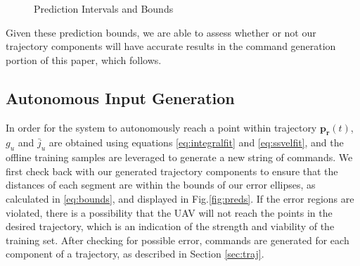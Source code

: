 \documentclass[letterpaper, 10 pt, conference]{ieeeconf}  %
\begin{document}
\begin{figure}[ht]
	\centering
	\caption{Prediction Intervals and Bounds}
	\label{fig:bounds}
\end{figure}

Given these prediction bounds, we are able to assess whether or not our trajectory components will have accurate results in the command generation portion of this paper, which follows.

\subsection{Autonomous Input Generation} \label{sec:generate}

In order for the system to autonomously reach a point within trajectory $\bm{p_r}(t)$, $g_u$ and $\bar{j}_u$ are obtained using equations \eqref{eq:integralfit} and \eqref{eq:ssvelfit}, and the offline training samples are leveraged to generate a new string of commands. We first check back with our generated trajectory components to ensure that the distances of each segment are within the bounds of our error ellipses, as calculated in \eqref{eq:bounds}, and displayed in Fig.\ref{fig:preds}. If the error regions are violated, there is a possibility that the UAV will not reach the points in the desired trajectory, which is an indication of the strength and viability of the training set. After checking for possible error, commands are generated for each component of a trajectory, as described in Section \ref{sec:traj}.
\end{document}
